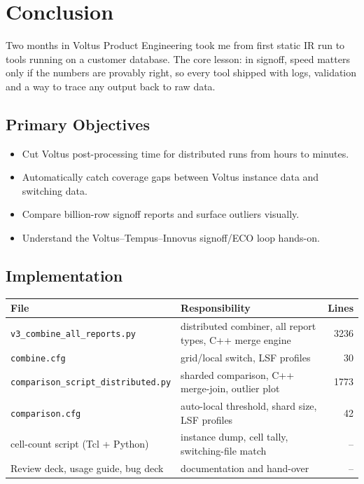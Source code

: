 \documentclass[11pt,a4paper]{article}
\newcommand{\fn}[1]{\texttt{#1}}                 %
\begin{document}
\section{Conclusion}
Two months in Voltus Product Engineering took me from first static IR run to tools running on
a customer database. The core lesson: in signoff, speed matters only if the numbers are
provably right, so every tool shipped with logs, validation and a way to trace any output
back to raw data.

\subsection{Primary Objectives}
\begin{itemize}
  \item Cut Voltus post-processing time for distributed runs from hours to minutes.
  \item Automatically catch coverage gaps between Voltus instance data and switching data.
  \item Compare billion-row signoff reports and surface outliers visually.
  \item Understand the Voltus--Tempus--Innovus signoff/ECO loop hands-on.
\end{itemize}

\subsection{Implementation}
\begin{center}
\small
\begin{tabularx}{\linewidth}{@{}lXr@{}}
\toprule
\textbf{File} & \textbf{Responsibility} & \textbf{Lines}\\
\midrule
\fn{v3\_combine\_all\_reports.py}      & distributed combiner, all report types, C++ merge engine & 3236\\
\fn{combine.cfg}                       & grid/local switch, LSF profiles                         & 30\\
\fn{comparison\_script\_distributed.py} & sharded comparison, C++ merge-join, outlier plot        & 1773\\
\fn{comparison.cfg}                    & auto-local threshold, shard size, LSF profiles          & 42\\
cell-count script (Tcl + Python)       & instance dump, cell tally, switching-file match         & --\\
Review deck, usage guide, bug deck     & documentation and hand-over                             & --\\
\bottomrule
\end{tabularx}
\end{center}
\end{document}
